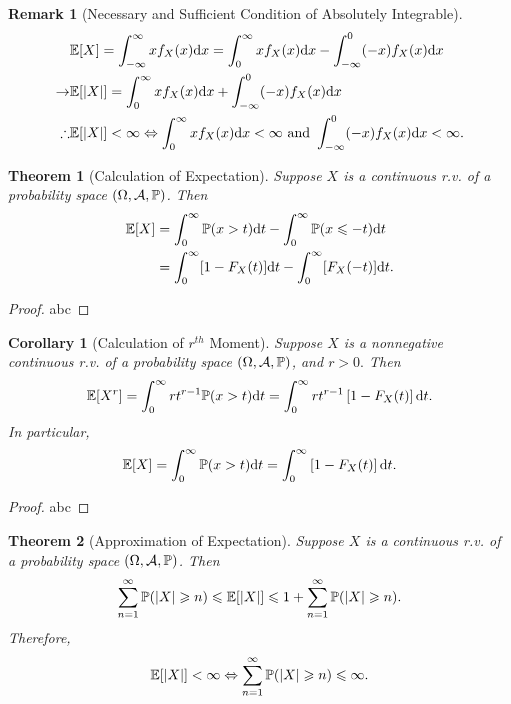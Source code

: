 \documentclass[openany,12pt]{book}
\newtheorem{theorem}{Theorem}[chapter]
\newtheorem{corollary}{Corollary}[chapter]
\newtheorem{remark}{Remark}[chapter]
\begin{document}
\begin{remark}[Necessary and Sufficient Condition of Absolutely Integrable]
  $$\begin{aligned}
                 & \mathbb{E}[X]=\int_{-\infty}^{\infty}xf_X(x)\mathrm{d} x=\int_{0}^{\infty}xf_X(x)\mathrm{d} x-\int_{-\infty}^{0}(-x)f_X(x)\mathrm{d} x                 \\
      \to        & \mathbb{E}[|X|]=\int_{0}^{\infty}xf_X(x)\mathrm{d} x+\int_{-\infty}^{0}(-x)f_X(x)\mathrm{d} x                                                    \\
      \therefore & \mathbb{E}[|X|]<\infty\Leftrightarrow \int_{0}^{\infty}xf_X(x)\mathrm{d} x<\infty  \text{ and } \int_{-\infty}^{0}(-x)f_X(x)\mathrm{d} x<\infty.
    \end{aligned}$$
\end{remark}

\begin{theorem}[Calculation of Expectation]
  Suppose $X$ is a continuous r.v. of a probability space $(\Omega,\mathcal{A},\mathbb{P})$.
  Then
  $$\begin{aligned}
      \mathbb{E}[X] & =\int_{0}^{\infty}\mathbb{P}(x>t)\mathrm{d} t-\int_{0}^{\infty}\mathbb{P}(x\leqslant-t)\mathrm{d} t \\
                    & =\int_{0}^{\infty}[1-F_X(t)]\mathrm{d} t-\int_{0}^{\infty}[F_X(-t)]\mathrm{d} t.
    \end{aligned}$$
\end{theorem}

\begin{proof}
  abc
\end{proof}

\begin{corollary}[Calculation of $r^{th}$ Moment]
  Suppose $X$ is a nonnegative continuous r.v. of a probability space $(\Omega,\mathcal{A},\mathbb{P})$, and $r>0.$ Then
  $$
    \mathbb{E}[ X^{r}] = \int_{0}^{\infty}{rt^{r - 1}}\mathbb{P}(x > t)\mathrm{d} t = \int_{0}^{\infty}{rt^{r - 1}}\left[ 1 - F_{X}( t) \right]\mathrm{d} t.
  $$
  In particular,
  $$
    \mathbb{E}[ X] = \int_{0}^{\infty}{\mathbb{P}(x > t)}\mathrm{d} t = \int_{0}^{\infty}\left[ 1 - F_{X}(t) \right]\mathrm{d} t.
  $$
\end{corollary}

\begin{proof}
  abc
\end{proof}

\begin{theorem}[Approximation of Expectation]
  Suppose $X$ is a continuous r.v. of a probability space $(\Omega,\mathcal{A},\mathbb{P})$. Then
  $$
    \sum_{n = 1}^{\infty}{\mathbb{P}(|X| \geqslant n)} \leqslant \mathbb{E}[|X|] \leqslant 1 + \sum_{n = 1}^{\infty}{\mathbb{P}( \left| X \right| \geqslant n)}.
  $$
  Therefore,
  $$
    \mathbb{E}[|X|] < \infty  \Leftrightarrow \sum_{n = 1}^{\infty}{\mathbb{P}(|X| \geqslant n)} \leqslant \infty.
  $$
\end{theorem}
\end{document}
